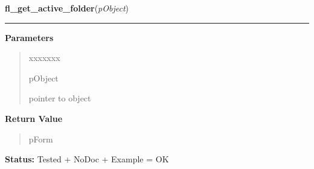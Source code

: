 \hspace{.8\funcindent}\begin{boxedminipage}{\funcwidth}

    \raggedright \textbf{fl\_get\_active\_folder}(\textit{pObject})

    \vspace{-1.5ex}

    \rule{\textwidth}{0.5\fboxrule}
\setlength{\parskip}{2ex}
\setlength{\parskip}{1ex}
      \textbf{Parameters}
      \vspace{-1ex}

      \begin{quote}
        \begin{Ventry}{xxxxxxx}

          \item[pObject]

          pointer to object

        \end{Ventry}

      \end{quote}

      \textbf{Return Value}
    \vspace{-1ex}

      \begin{quote}
      pForm

      \end{quote}

\textbf{Status:} Tested + NoDoc + Example = OK



    \end{boxedminipage}

    \label{xformslib:library:fl_get_active_folder_number}

    \vspace{0.5ex}

